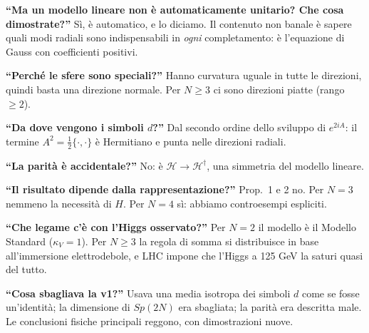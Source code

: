 \documentclass[11pt,a4paper]{article}
\numberwithin{equation}{section}
\theoremstyle{remark}
\newcommand{\Hf}{\mathcal{H}}
\begin{document}
\textbf{``Ma un modello lineare non è automaticamente unitario? Che cosa dimostrate?''} Sì, è automatico, e lo diciamo. Il contenuto non banale è sapere quali modi radiali sono indispensabili in \emph{ogni} completamento: è l'equazione di Gauss con coefficienti positivi.

\textbf{``Perché le sfere sono speciali?''} Hanno curvatura uguale in tutte le direzioni, quindi basta una direzione normale. Per $N\ge3$ ci sono direzioni piatte (rango $\ge2$).

\textbf{``Da dove vengono i simboli $d$?''} Dal secondo ordine dello sviluppo di $e^{2iA}$: il termine $A^2=\frac12\{\cdot,\cdot\}$ è Hermitiano e punta nelle direzioni radiali.

\textbf{``La parità è accidentale?''} No: è $\Hf\to\Hf^\dagger$, una simmetria del modello lineare.

\textbf{``Il risultato dipende dalla rappresentazione?''} Prop.~1 e 2 no. Per $N=3$ nemmeno la necessità di $H$. Per $N=4$ sì: abbiamo controesempi espliciti.

\textbf{``Che legame c'è con l'Higgs osservato?''} Per $N=2$ il modello è il Modello Standard ($\kappa_V=1$). Per $N\ge3$ la regola di somma si distribuisce in base all'immersione elettrodebole, e LHC impone che l'Higgs a 125 GeV la saturi quasi del tutto.

\textbf{``Cosa sbagliava la v1?''} Usava una media isotropa dei simboli $d$ come se fosse un'identità; la dimensione di $Sp(2N)$ era sbagliata; la parità era descritta male. Le conclusioni fisiche principali reggono, con dimostrazioni nuove.
\end{document}
